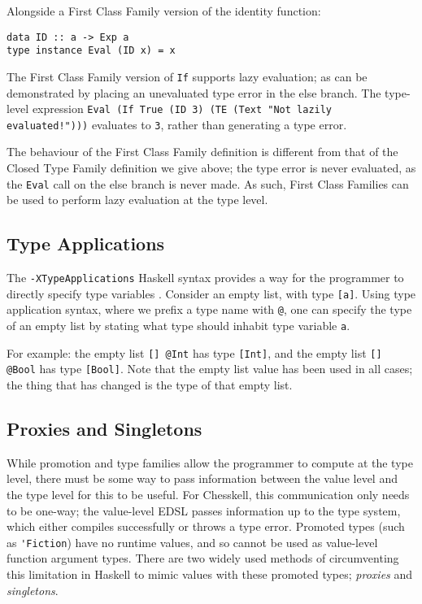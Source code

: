 \documentclass[12pt, a4paper, bibliography=totocnumbered]{scrreprt}
\newcommand{\inline}[1]{\lstinline[basicstyle=\ttfamily\footnotesize]{#1}}
\begin{document}
Alongside a First Class Family version of the identity function:

\begin{lstlisting}
data ID :: a -> Exp a
type instance Eval (ID x) = x
\end{lstlisting}

The First Class Family version of \inline{If} supports lazy evaluation; as can be demonstrated by placing an unevaluated type error in the else branch. The type-level expression \inline{Eval (If True (ID 3) (TE (Text "Not lazily evaluated!")))} evaluates to \inline{3}, rather than generating a type error.

The behaviour of the First Class Family definition is different from that of the Closed Type Family definition we give above; the type error is never evaluated, as the \inline{Eval} call on the else branch is never made. As such, First Class Families can be used to perform lazy evaluation at the type level.

\subsection{Type Applications}

The \inline{-XTypeApplications} Haskell syntax provides a way for the programmer to directly specify type variables \cite{typeapplication}. Consider an empty list, with type \inline{[a]}. Using type application syntax, where we prefix a type name with \inline{@}, one can specify the type of an empty list by stating what type should inhabit type variable \inline{a}.

For example: the empty list \inline{[] @Int} has type \inline{[Int]}, and the empty list \inline{[] @Bool} has type \inline{[Bool]}. Note that the empty list value has been used in all cases; the thing that has changed is the type of that empty list.

\subsection{Proxies and Singletons}

While promotion and type families allow the programmer to compute at the type level, there must be some way to pass information between the value level and the type level for this to be useful. For Chesskell, this communication only needs to be one-way; the value-level EDSL passes information up to the type system, which either compiles successfully or throws a type error. Promoted types (such as \inline{'Fiction}) have no runtime values, and so cannot be used as value-level function argument types. There are two widely used methods of circumventing this limitation in Haskell to mimic values with these promoted types; \emph{proxies} and \emph{singletons}.
\end{document}
